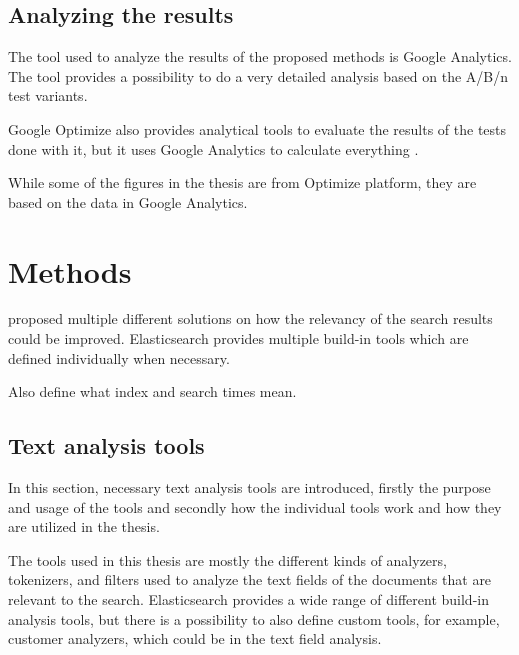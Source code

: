 \section{Analyzing the results}
\label{ch:analysis}
The tool used to analyze the results of the proposed methods is Google Analytics.  
The tool provides a possibility to do a very detailed analysis based on the A/B/n test variants. 
\cite{analyticsAbout}

Google Optimize also provides analytical tools to evaluate the results of the tests done with it, 
but it uses Google Analytics to calculate everything \cite{optimizeAbout}. 

\todo{}
While some of the figures in the thesis are from Optimize platform, they are based on the data in Google Analytics.




\chapter{Methods}
\label{ch:methods}

\citeauthor{relevantSearch} proposed multiple different solutions on how the relevancy of the search results could be improved.
Elasticsearch provides multiple build-in tools which are defined individually when necessary. \cite{relevantSearch}

\todo{} 
Also define what index and search times mean.

\section{Text analysis tools}
\label{sec:textAnalysisTools}
In this section, necessary text analysis tools are introduced, 
firstly the purpose and usage of the tools and secondly how the individual tools work and how they are utilized in the thesis.

The tools used in this thesis are mostly the different kinds of analyzers, tokenizers, and filters 
used to analyze the text fields of the documents that are relevant to the search. 
Elasticsearch provides a wide range of different build-in analysis tools, 
but there is a possibility to also define custom tools, for example, customer analyzers, 
which could be in the text field analysis. \cite{elasticIntro}

